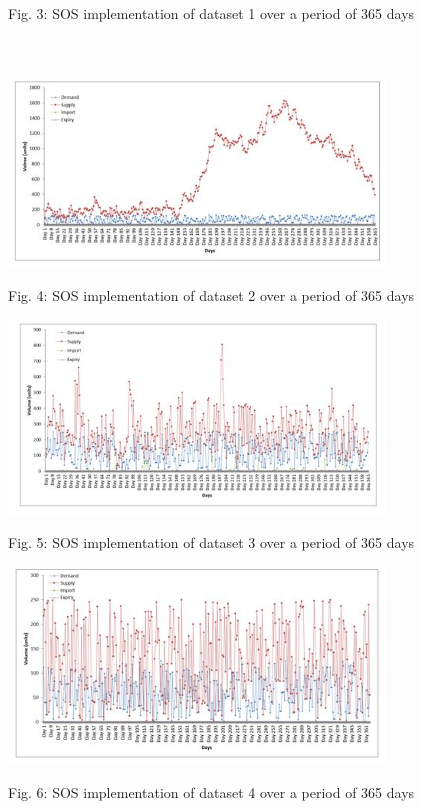 \documentclass{article}
\begin{document}
\begin {center}
Fig. 3: { SOS implementation of dataset 1 over a period of 365 days}
\end{center}\\
\\
\includegraphics[width=0.75\textwidth, center]{Images/Fig4.JPG}
\begin {center}
Fig. 4: { SOS implementation of dataset 2 over a period of 365 days}

\end {center}

\includegraphics[width=0.75\textwidth, center]{Images/Fig5.JPG}
\begin {center}
Fig. 5: { SOS implementation of dataset 3 over a period of 365 days}
\break
\end {center}

\includegraphics[width=0.75\textwidth, center]{Images/Fig6.JPG}
\begin {center}
Fig. 6: { SOS implementation of dataset 4 over a period of 365 days}

\end {center}
\end{document}

